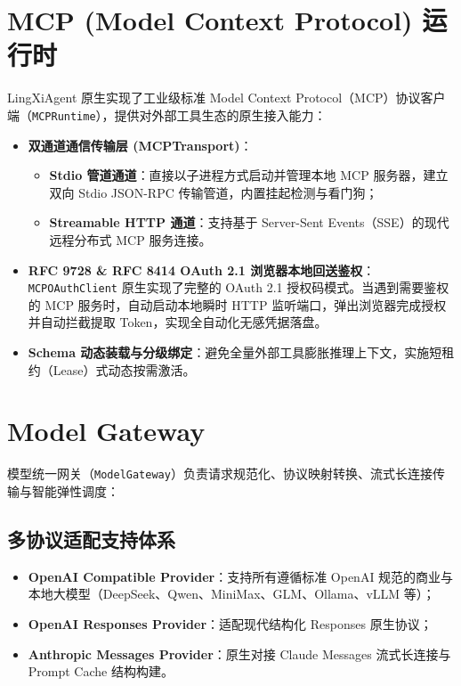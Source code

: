 \documentclass[11pt,a4paper]{article}
\begin{document}
\section{MCP (Model Context Protocol) 运行时}

LingXiAgent 原生实现了工业级标准 Model Context Protocol（MCP）协议客户端（\texttt{MCPRuntime}），提供对外部工具生态的原生接入能力：

\begin{itemize}
    \item \textbf{双通道通信传输层 (MCPTransport)}：
    \begin{itemize}
        \item \textbf{Stdio 管道通道}：直接以子进程方式启动并管理本地 MCP 服务器，建立双向 Stdio JSON-RPC 传输管道，内置挂起检测与看门狗；
        \item \textbf{Streamable HTTP 通道}：支持基于 Server-Sent Events（SSE）的现代远程分布式 MCP 服务连接。
    \end{itemize}
    \item \textbf{RFC 9728 \& RFC 8414 OAuth 2.1 浏览器本地回送鉴权}：\texttt{MCPOAuthClient} 原生实现了完整的 OAuth 2.1 授权码模式。当遇到需要鉴权的 MCP 服务时，自动启动本地瞬时 HTTP 监听端口，弹出浏览器完成授权并自动拦截提取 Token，实现全自动化无感凭据落盘。
    \item \textbf{Schema 动态装载与分级绑定}：避免全量外部工具膨胀推理上下文，实施短租约（Lease）式动态按需激活。
\end{itemize}

\section{Model Gateway}

模型统一网关（\texttt{ModelGateway}）负责请求规范化、协议映射转换、流式长连接传输与智能弹性调度：

\subsection{多协议适配支持体系}
\begin{itemize}
    \item \textbf{OpenAI Compatible Provider}：支持所有遵循标准 OpenAI 规范的商业与本地大模型（DeepSeek、Qwen、MiniMax、GLM、Ollama、vLLM 等）；
    \item \textbf{OpenAI Responses Provider}：适配现代结构化 Responses 原生协议；
    \item \textbf{Anthropic Messages Provider}：原生对接 Claude Messages 流式长连接与 Prompt Cache 结构构建。
\end{itemize}
\end{document}
